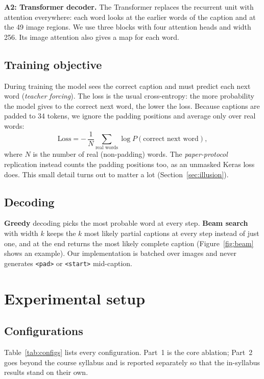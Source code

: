 \documentclass[11pt]{article}
\begin{document}
\textbf{A2: Transformer decoder.} The Transformer \cite{vaswani2017} replaces the recurrent unit with attention everywhere: each word looks at the earlier words of the caption and at the 49 image regions. We use three blocks with four attention heads and width 256. Its image attention also gives a map for each word.

\subsection{Training objective}
During training the model sees the correct caption and must predict each next word (\emph{teacher forcing}). The loss is the usual cross-entropy: the more probability the model gives to the correct next word, the lower the loss. Because captions are padded to 34 tokens, we ignore the padding positions and average only over real words:
\begin{equation}
\text{Loss} = -\,\frac{1}{N}\sum_{\text{real words}} \log P(\text{correct next word}),
\end{equation}
where $N$ is the number of real (non-padding) words. The \emph{paper-protocol} replication instead counts the padding positions too, as an unmasked Keras loss does. This small detail turns out to matter a lot (Section~\ref{sec:illusion}).

\subsection{Decoding}
\textbf{Greedy} decoding picks the most probable word at every step. \textbf{Beam search} with width $k$ keeps the $k$ most likely partial captions at every step instead of just one, and at the end returns the most likely complete caption (Figure~\ref{fig:beam} shows an example). Our implementation is batched over images and never generates \texttt{<pad>} or \texttt{<start>} mid-caption.

\section{Experimental setup}\label{sec:setup}

\subsection{Configurations}
Table~\ref{tab:configs} lists every configuration. Part~1 is the core ablation; Part~2 goes beyond the course syllabus and is reported separately so that the in-syllabus results stand on their own.
\end{document}
